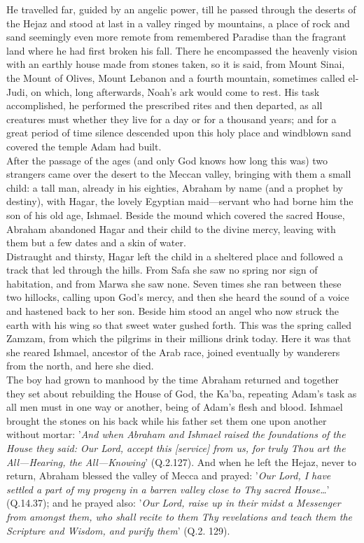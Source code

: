 \documentclass[11pt, b5paper, twoside]{book}
\begin{document}
He travelled far, guided by an angelic power, till he passed through the deserts of the Hejaz and 
stood at last in a valley ringed by mountains, a place of rock and sand seemingly even more remote 
from remembered Paradise than the fragrant land where he had first broken his fall. There he 
encompassed the heavenly vision with an earthly house made from stones taken, so it is said, from 
Mount Sinai, the Mount of Olives, Mount Lebanon and a fourth mountain, sometimes called el-Judi, on 
which, long afterwards, Noah's ark would come to rest. His task accomplished, he performed the 
prescribed rites and then departed, as all creatures must whether they live for a day or for a 
thousand years; and for a great period of time silence descended upon this holy place and windblown sand covered the temple Adam had built. \\

After the passage of the ages (and only God knows how long this was) two strangers came over the 
desert to the Meccan valley, bringing with them a small child: a tall man, already in his eighties, 
Abraham by name (and a prophet by destiny), with Hagar, the lovely Egyptian maid---servant who had 
borne him the son of his old age, Ishmael. Beside the mound which covered the sacred House, Abraham 
abandoned Hagar and their child to the divine mercy, leaving with them but a few dates and a skin of 
water. \\

Distraught and thirsty, Hagar left the child in a sheltered place and followed a track that led 
through the hills. From Safa she saw no spring nor sign of habitation, and from Marwa she saw none. 
Seven times she ran between these two hillocks, calling upon God's mercy, and then she heard the 
sound of a voice and hastened back to her son. Beside him stood an angel who now struck the earth 
with his wing so that sweet water gushed forth. This was the spring called Zamzam, from which the 
pilgrims in their millions drink today. Here it was that she reared Ishmael, ancestor of the Arab 
race, joined eventually by wanderers from the north, and here she died. \\

The boy had grown to manhood by the time Abraham returned and together they set about rebuilding the 
House of God, the Ka'ba, repeating Adam's task as all men must in one way or another, being of Adam's 
flesh and blood. Ishmael brought the stones on his back while his father set them one upon another 
without mortar: '\emph{And when Abraham and Ishmael raised the foundations of the House they said: Our Lord, accept this [service] from us, for truly Thou art the All---Hearing, the All---Knowing}' (Q.2.127). 
And when he left the Hejaz, never to return, Abraham blessed the valley of Mecca and prayed: '\emph{Our Lord, I have settled a part of my progeny in a barren valley close to Thy sacred House\ldots{}}' (Q.14.37); and he prayed also: '\emph{Our Lord, raise up in their midst a Messenger from amongst them, who shall recite to them Thy revelations and teach them the Scripture and Wisdom, and purify them}' (Q.2. 129). \\
\end{document}

